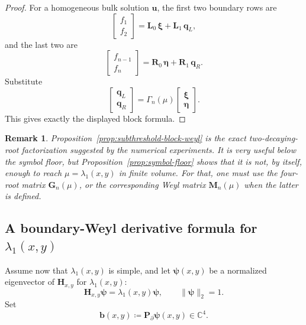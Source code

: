 \documentclass[11pt]{article}
\newtheorem{remark}[theorem]{Remark}
\begin{document}
\begin{proof}
For a homogeneous bulk solution \(\mathbf u\), the first two boundary rows are
\[
\begin{bmatrix}
f_1\\
f_2
\end{bmatrix}
=
\mathbf L_0\,\boldsymbol{\xi}+\mathbf L_1\,\mathbf q_L,
\]
and the last two are
\[
\begin{bmatrix}
f_{n-1}\\
f_n
\end{bmatrix}
=
\mathbf R_0\,\boldsymbol{\eta}+\mathbf R_1\,\mathbf q_R.
\]
Substitute
\[
\begin{bmatrix}
\mathbf q_L\\
\mathbf q_R
\end{bmatrix}
=
\Gamma_n(\mu)
\begin{bmatrix}
\boldsymbol{\xi}\\
\boldsymbol{\eta}
\end{bmatrix}.
\]
This gives exactly the displayed block formula.
\end{proof}

\begin{remark}
Proposition~\ref{prop:subthreshold-block-weyl} is the exact two-decaying-root factorization suggested by the numerical experiments. It is very useful below the symbol floor, but Proposition~\ref{prop:symbol-floor} shows that it is not, by itself, enough to reach \(\mu=\lambda_1(x,y)\) in finite volume. For that, one must use the four-root matrix \(\mathbf G_n(\mu)\), or the corresponding Weyl matrix \(\mathbf M_n(\mu)\) when the latter is defined.
\end{remark}

\subsection*{A boundary-Weyl derivative formula for \(\lambda_1(x,y)\)}

Assume now that \(\lambda_1(x,y)\) is simple, and let \(\boldsymbol{\psi}(x,y)\) be a normalized eigenvector of
\(\mathbf H_{x,y}\) for \(\lambda_1(x,y)\):
\[
\mathbf H_{x,y}\boldsymbol{\psi}=\lambda_1(x,y)\boldsymbol{\psi},
\qquad
\|\boldsymbol{\psi}\|_2=1.
\]
Set
\[
\mathbf b(x,y)\coloneqq \mathbf P_\partial \boldsymbol{\psi}(x,y)\in\mathbb C^4.
\]
\end{document}
